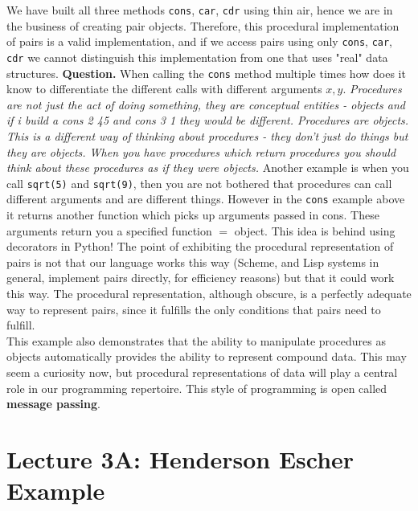 \documentclass[a4paper,twoside]{article}
\numberwithin{equation}{section}
\begin{document}
We have built all three methods \texttt{cons}, \texttt{car}, \texttt{cdr}
using thin air, hence we are in the business of creating pair objects. Therefore, this
procedural implementation of pairs is a valid implementation,
and if we access pairs using only \texttt{cons}, \texttt{car}, \texttt{cdr}
we cannot distinguish this implementation from one that uses "real" data structures.\newline
\textbf{Question.} When calling the \texttt{cons} method multiple times how does it
know to differentiate the different calls
with different arguments $x, y$.
\textit{Procedures are not just the act of doing something, they are conceptual entities - objects
    and if i
    build a cons 2 45 and cons 3 1 they would be different. Procedures are objects. This is a
    different way of
    thinking about procedures - they don't just do things but they are objects. When you have
    procedures which
    return procedures you should think about these procedures as if they were objects.}
Another example is when you call \texttt{sqrt(5)} and \texttt{sqrt(9)}, then you are not
bothered that procedures can call different arguments and are different things. However in the
\texttt{cons} example above it returns another function which picks up arguments passed in cons.
These arguments return you a specified function $=$ object. This idea is behind using decorators in Python!
The point of exhibiting the procedural representation of pairs is not that our language works this way
(Scheme, and Lisp systems in general, implement pairs directly, for eﬃciency reasons) but that it
could work this way.
The procedural representation, although obscure, is a perfectly
adequate way to represent pairs, since it fulfills the only conditions that pairs need to fulfill.\\
This example also demonstrates that the ability to manipulate procedures as objects automatically
provides the ability to represent compound data.
This may seem a curiosity now, but procedural representations of data will play a central role in our
programming repertoire.
This style of programming is open called \textbf{message passing}.

\section{Lecture 3A: Henderson Escher Example}
\end{document}
